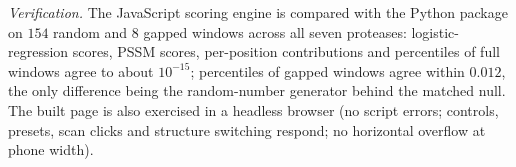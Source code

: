 \emph{Verification.} The JavaScript scoring engine is compared with the Python package on $154$ random and $8$ gapped windows across all seven proteases: logistic-regression scores, PSSM scores, per-position contributions and percentiles of full windows agree to about $10^{-15}$; percentiles of gapped windows agree within $0.012$, the only difference being the random-number generator behind the matched null. The built page is also exercised in a headless browser (no script errors; controls, presets, scan clicks and structure switching respond; no horizontal overflow at phone width).
